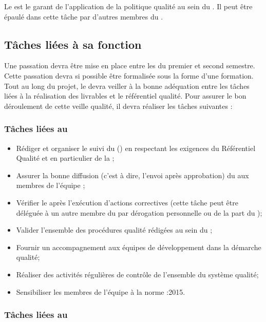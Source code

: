 Le \RQ{} est le garant de l’application de la politique qualité au sein du \PICCourt. Il peut être épaulé dans cette tâche par d’autres membres du \PICCourt.

\subsection*{Tâches liées à sa fonction}

Une passation devra être mise en place entre les \RQs{} du premier et second semestre. Cette passation devra si possible être formalisée sous la forme d’une formation.\\
Tout au long du projet, le \RQ{} devra veiller à la bonne adéquation entre les tâches liées à la réalisation des livrables et le référentiel qualité. Pour assurer le bon déroulement de cette veille qualité, il devra réaliser les tâches suivantes :

\subsubsection*{Tâches liées au \PQCourt}
\begin{itemize}

	\item Rédiger et organiser le suivi du \PQ (\PQCourt) en respectant les exigences du Référentiel Qualité et en particulier de la \DGQDEUXCourt;
	\item Assurer la bonne diffusion (c’est à dire, l’envoi après approbation) du \PQCourt{} aux membres de l’équipe \PICCourt;
	\item Vérifier le \PQCourt{} après l’exécution d’actions correctives (cette tâche peut être déléguée à un autre membre du \PICCourt par dérogation personnelle ou de la part du \CP);


	\item Valider l’ensemble des procédures qualité rédigées au sein du \PICCourt;
	\item Fournir un accompagnement aux équipes de développement dans la démarche qualité;
	\item Réaliser des activités régulières de contrôle de l’ensemble du système qualité;
	\item Sensibiliser les membres de l’équipe \PICCourt{} à la norme :2015.
\end{itemize}

\subsubsection*{Tâches liées au \PGCCourt}

